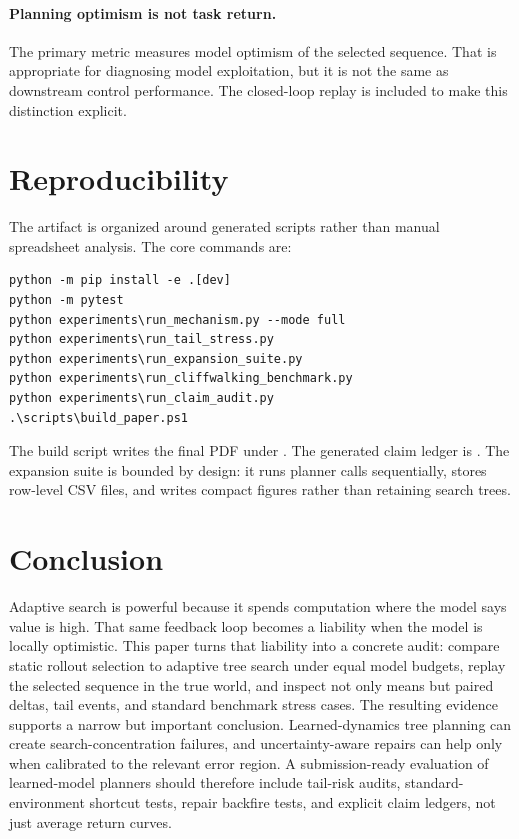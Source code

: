 \documentclass{article}
\begin{document}
\paragraph{Planning optimism is not task return.}
The primary metric measures model optimism of the selected sequence. That is appropriate for diagnosing model exploitation, but it is not the same as downstream control performance. The closed-loop replay is included to make this distinction explicit.

\section{Reproducibility}

The artifact is organized around generated scripts rather than manual spreadsheet analysis. The core commands are:
\begin{verbatim}
python -m pip install -e .[dev]
python -m pytest
python experiments\run_mechanism.py --mode full
python experiments\run_tail_stress.py
python experiments\run_expansion_suite.py
python experiments\run_cliffwalking_benchmark.py
python experiments\run_claim_audit.py
.\scripts\build_paper.ps1
\end{verbatim}
The build script writes the final PDF under . The generated claim ledger is . The expansion suite is bounded by design: it runs planner calls sequentially, stores row-level CSV files, and writes compact figures rather than retaining search trees.

\section{Conclusion}

Adaptive search is powerful because it spends computation where the model says value is high. That same feedback loop becomes a liability when the model is locally optimistic. This paper turns that liability into a concrete audit: compare static rollout selection to adaptive tree search under equal model budgets, replay the selected sequence in the true world, and inspect not only means but paired deltas, tail events, and standard benchmark stress cases. The resulting evidence supports a narrow but important conclusion. Learned-dynamics tree planning can create search-concentration failures, and uncertainty-aware repairs can help only when calibrated to the relevant error region. A submission-ready evaluation of learned-model planners should therefore include tail-risk audits, standard-environment shortcut tests, repair backfire tests, and explicit claim ledgers, not just average return curves.
\end{document}
